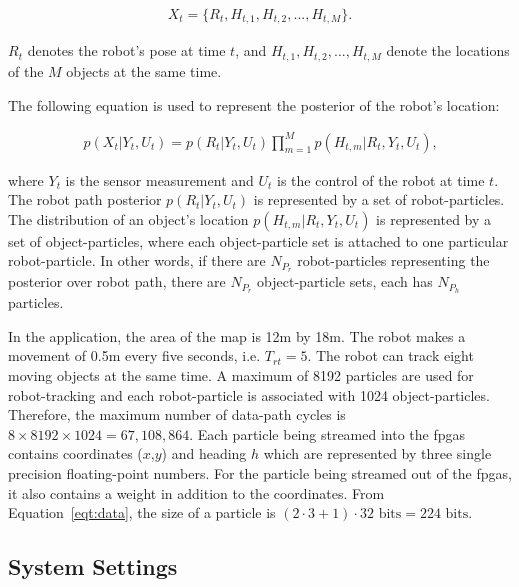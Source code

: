 \begin{equation}
\begin{aligned}
X_t = \{R_t, H_{t,1}, H_{t,2}, ..., H_{t,M}\} \mbox{.}
\end{aligned}
\end{equation}

$R_t$ denotes the robot's pose at time $t$, and $H_{t,1}, H_{t,2}, ..., H_{t,M}$ denote the locations of the $M$ objects at the same time.

The following equation is used to represent the posterior of the robot's location:

\begin{equation}
\begin{aligned}
p(X_t|Y_t,U_t) = p(R_t|Y_t,U_t) \prod_{m=1}^M p(H_{t,m}|R_t,Y_t,U_t) \mbox{,}
\end{aligned}
\end{equation}

where $Y_t$ is the sensor measurement and $U_t$ is the control of the robot at time $t$.
The robot path posterior $p(R_t|Y_t,U_t)$ is represented by a set of robot-particles.
The distribution of an object's location $p(H_{t,m}|R_t,Y_t,U_t)$ is represented by a set of object-particles, where each object-particle set is attached to one particular robot-particle.
In other words, if there are ${N_{P_r}}$ robot-particles representing the posterior over robot path, there are ${N_{P_r}}$ object-particle sets, each has ${N_{P_h}}$ particles.

In the application, the area of the map is 12m by 18m.
The robot makes a movement of 0.5m every five seconds, i.e. $T_{rt} = 5$.
The robot can track eight moving objects at the same time.
A maximum of 8192 particles are used for robot-tracking and each robot-particle is associated with 1024 object-particles.
Therefore, the maximum number of data-path cycles is $8 \times 8192 \times 1024=67,108,864$.
Each particle being streamed into the \glspl{fpga} contains coordinates ($x$,$y$) and heading $h$ which are represented by three single precision floating-point numbers.
For the particle being streamed out of the \glspl{fpga}, it also contains a weight in addition to the coordinates.
From Equation~\ref{eqt:data}, the size of a particle is $(2 \cdot 3 + 1) \cdot 32 \mbox{ bits} = 224 \mbox{ bits}$.

\subsection{System Settings}

